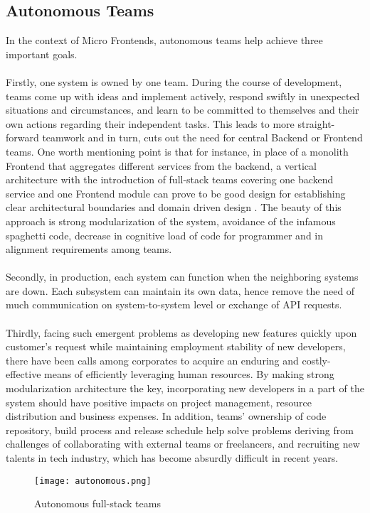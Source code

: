 \documentclass[a4paper]{book}
\begin{document}
\subsection{Autonomous Teams}

In the context of Micro Frontends, autonomous teams help achieve three important goals.
\\ \\
Firstly, one system is owned by one team. During the course of development, teams come up with ideas and implement actively, respond swiftly in unexpected situations and circumstances, and learn to be committed to themselves and their own actions regarding their independent tasks. This leads to more straight-forward teamwork and in turn, cuts out the need for central Backend or Frontend teams. One worth mentioning point is that for instance, in place of a monolith Frontend that aggregates different services from the backend, a vertical architecture with the introduction of full-stack teams covering one backend service and one Frontend module can prove to be good design for establishing clear architectural boundaries and domain driven design \cite{DDD}. The beauty of this approach is strong modularization of the system, avoidance of the infamous spaghetti code, decrease in cognitive load of code for programmer and in alignment requirements among teams.
\\ \\
Secondly, in production, each system can function when the neighboring systems are down. Each subsystem can maintain its own data, hence remove the need of much communication on system-to-system level or exchange of API requests.
\\ \\
Thirdly, facing such emergent problems as developing new features quickly upon customer’s request while maintaining employment stability of new developers, there have been calls among corporates to acquire an enduring and costly-effective means of efficiently leveraging human resources. By making strong modularization architecture the key, incorporating new developers in a part of the system should have positive impacts on project management, resource distribution and business expenses. In addition, teams’ ownership of code repository, build process and release schedule help solve problems deriving from challenges of collaborating with external teams or freelancers, and recruiting new talents in tech industry, which has become absurdly difficult in recent years.
\clearpage
\begin{figure}
    \centering
    \texttt{[image: autonomous.png]}
    \caption{Autonomous full-stack teams \cite{Gee20}}
    \label{fig:my_label}
\end{figure}
\end{document}

